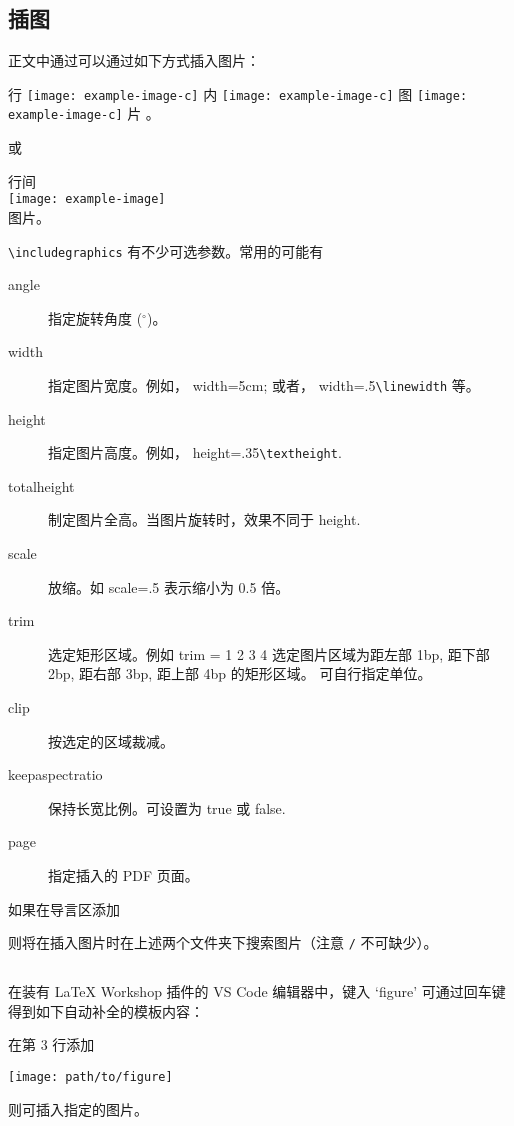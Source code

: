 \subsection{插图}
正文中通过可以通过如下方式插入图片：
\begin{vertlst}
  
行
\texttt{[image: example-image-c]}
内
\texttt{[image: example-image-c]}
图
\texttt{[image: example-image-c]}
片
。
\end{vertlst}
或
\begin{vertlst}
行间 \\
\texttt{[image: example-image]} \\
图片。
\end{vertlst}

\verb+\includegraphics+ 有不少可选参数。常用的可能有
\begin{description}
  \item[angle] 指定旋转角度 ($^\circ$)。
  \item[width] 指定图片宽度。例如， width=5cm; 或者， width=.5\verb+\linewidth+ 等。
  \item[height] 指定图片高度。例如， height=.35\verb+\textheight+.
  \item[totalheight] 制定图片全高。当图片旋转时，效果不同于 height.
  \item[scale] 放缩。如 scale=.5 表示缩小为 0.5 倍。 
  \item[trim] 选定矩形区域。例如 trim = 1 2 3 4 选定图片区域为距左部 1bp, 距下部 2bp, 距右部 3bp, 距上部 4bp 的矩形区域。 可自行指定单位。
  \item[clip] 按选定的区域裁减。
  \item[keepaspectratio] 保持长宽比例。可设置为 true 或 false. 
  \item[page] 指定插入的 PDF 页面。 
\end{description}
如果在导言区添加
\begin{texlst}
\graphicspath{{Demos/}{Images/}}
\end{texlst}
则将在插入图片时在上述两个文件夹下搜索图片（注意 \verb+/+ 不可缺少）。


\subsection{}
在装有 LaTeX Workshop 插件的 VS Code 编辑器中，键入 `figure' 可通过回车键得到如下自动补全的模板内容：
\begin{texlst}
\begin{figure}[]
  \centering
  
  \caption{}
  \label{}
\end{figure}
\end{texlst}
在第 3 行添加
\begin{texlst}
\texttt{[image: path/to/figure]}
\end{texlst}
则可插入指定的图片。

